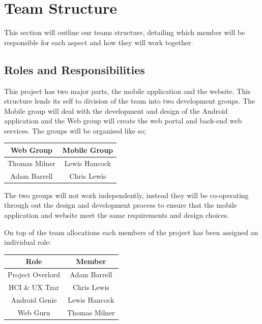 \documentclass[11pt,a4paper]{article}
\begin{document}
\section{Team Structure}
\label{sec:team-structure}
This section will outline our teams structure, detailing which member will be responsible for each aspect and how they will work together. 

\subsection{Roles and Responsibilities}
This project has two major parts, the mobile application and the website. This structure lends its self to division of the team into two development groups. The Mobile group will deal with the development and design of the Android application and the Web group will create the web portal and back-end web services. The groups will be organised like so;  
\begin{table}[h]
\begin{center}
\begin{tabular}{|c|c|}
\hline
\textbf{Web Group} & \textbf{Mobile Group} \\
\hline
Thomas Milner & Lewis Hancock \\
Adam Barrell & Chris Lewis \\ \hline
\end{tabular}
\end{center}
\end{table}

The two groups will not work independently, instead they will be co-operating through out the design and development process to ensure that the mobile application and website meet the same requirements and design choices. 

On top of the team allocations each members of the project has been assigned an individual role:

\begin{table}[H]
\begin{center}
\begin{tabular}{|c|c|}
\hline
\textbf{Role} & \textbf{Member} \\
\hline
Project Overlord & Adam Barrell  \\\hline
HCI \& UX Tzar & Chris Lewis \\ \hline
Android Genie & Lewis Hancock \\\hline
Web Guru & Thomas Milner \\\hline
\end{tabular}
\end{center}
\end{table}
\end{document}
